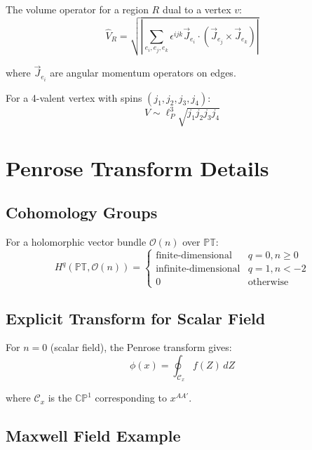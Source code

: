 \documentclass[12pt,a4paper]{article}
\theoremstyle{definition}
\newcommand{\CP}{\mathbb{CP}}
\begin{document}
The volume operator for a region $R$ dual to a vertex $v$:
\begin{equation}
\hat{V}_R = \sqrt{\left|\sum_{e_i, e_j, e_k} \epsilon^{ijk} \vec{J}_{e_i} \cdot (\vec{J}_{e_j} \times \vec{J}_{e_k})\right|}
\end{equation}

where $\vec{J}_{e_i}$ are angular momentum operators on edges.

For a 4-valent vertex with spins $(j_1, j_2, j_3, j_4)$:
\begin{equation}
V \sim \ell_P^3 \sqrt{j_1 j_2 j_3 j_4}
\end{equation}

\section{Penrose Transform Details}

\subsection{Cohomology Groups}

For a holomorphic vector bundle $\mathcal{O}(n)$ over $\mathbb{PT}$:
\begin{equation}
H^q(\mathbb{PT}, \mathcal{O}(n)) = \begin{cases}
\text{finite-dimensional} & q=0, n\geq 0 \\
\text{infinite-dimensional} & q=1, n < -2 \\
0 & \text{otherwise}
\end{cases}
\end{equation}

\subsection{Explicit Transform for Scalar Field}

For $n=0$ (scalar field), the Penrose transform gives:
\begin{equation}
\phi(x) = \oint_{\mathcal{C}_x} f(Z) \, dZ
\end{equation}

where $\mathcal{C}_x$ is the $\CP^1$ corresponding to $x^{AA'}$.

\subsection{Maxwell Field Example}
\end{document}
